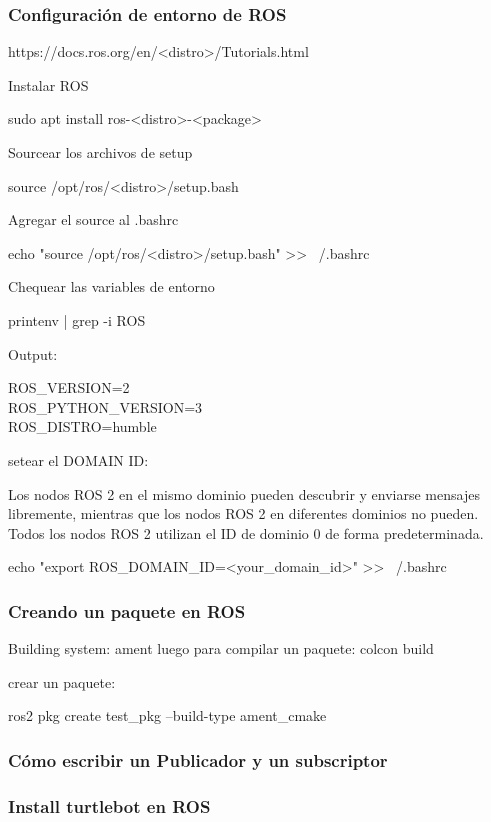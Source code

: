 \begin{frame}
	\frametitle{Configuración de entorno de ROS}
    
    https://docs.ros.org/en/<distro>/Tutorials.html
    
    Instalar ROS
    
    sudo apt install ros-<distro>-<package>
    
    Sourcear los archivos de setup
    
    source /opt/ros/<distro>/setup.bash
    
    Agregar el source al .bashrc
    
    echo "source /opt/ros/<distro>/setup.bash" >> ~/.bashrc
    
    Chequear las variables de entorno
    
    printenv | grep -i ROS
    
    Output:
    
    ROS\_VERSION=2\\
    ROS\_PYTHON\_VERSION=3\\
    ROS\_DISTRO=humble
    
    

    setear el DOMAIN ID:
    
    Los nodos ROS 2 en el mismo dominio pueden descubrir y enviarse mensajes libremente, mientras que los nodos ROS 2 en diferentes dominios no pueden. Todos los nodos ROS 2 utilizan el ID de dominio 0 de forma predeterminada.
    
    echo "export ROS\_DOMAIN\_ID=<your\_domain\_id>" >> ~/.bashrc
	
	
\end{frame}

\begin{frame}
	\frametitle{Creando un paquete en ROS}
	
     Building system: ament
     luego para compilar un paquete: colcon build
     
     
     crear un paquete:
     
     ros2 pkg create test\_pkg --build-type ament\_cmake
	
\end{frame}

\begin{frame}
	\frametitle{Cómo escribir un Publicador y un subscriptor}

\end{frame}


\begin{frame}
	\frametitle{Install turtlebot en ROS}
	
\end{frame}

